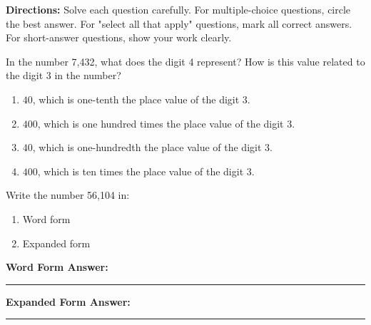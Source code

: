 \documentclass[12pt]{article}
\begin{document}

\begin{tcolorbox}[colframe=black!50, colback=white, title=Assessment Directions]
\textbf{Directions:} Solve each question carefully. For multiple-choice questions, circle the best answer. For "select all that apply" questions, mark all correct answers. For short-answer questions, show your work clearly.
\end{tcolorbox}

\begin{tcolorbox}[colframe=black!50, colback=white, title=\textbf{Problem 1}]
In the number 7,432, what does the digit 4 represent? How is this value related to the digit 3 in the number?

\begin{enumerate}[label=(\Alph*)]
    \item \(40\), which is one-tenth the place value of the digit 3.
    \item \(400\), which is one hundred times the place value of the digit 3.
    \item \(40\), which is one-hundredth the place value of the digit 3.
    \item \(400\), which is ten times the place value of the digit 3.
\end{enumerate}
\end{tcolorbox}

\begin{tcolorbox}[colframe=black!50, colback=white, title=\textbf{Problem 2}]
Write the number 56,104 in:
\begin{enumerate}
    \item Word form
    \item Expanded form
\end{enumerate}

\vspace{1cm}
\textbf{Word Form Answer:}  
\vspace{.5cm}
\rule{0.7\textwidth}{0.4mm}
\vspace{.2cm}

\textbf{Expanded Form Answer:}  
\vspace{.2cm}
\rule{0.63\textwidth}{0.4mm}
\end{tcolorbox}
\end{document}
